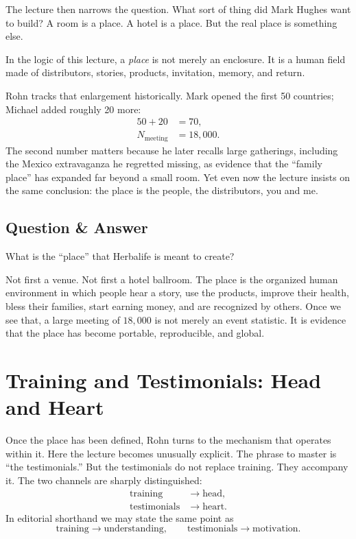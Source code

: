 The lecture then narrows the question. What sort of thing did Mark Hughes want to build? A room is a place. A hotel is a place. But the real place is something else.

\begin{definition}
In the logic of this lecture, a \emph{place} is not merely an enclosure. It is a human field made of distributors, stories, products, invitation, memory, and return.
\end{definition}

Rohn tracks that enlargement historically. Mark opened the first 50 countries; Michael added roughly 20 more:
\begin{align}
50 + 20 &= 70,\\
N_{\text{meeting}} &= 18{,}000.
\end{align}
The second number matters because he later recalls large gatherings, including the Mexico extravaganza he regretted missing, as evidence that the ``family place'' has expanded far beyond a small room. Yet even now the lecture insists on the same conclusion: the place is the people, the distributors, you and me.

\subsection{Question \& Answer}

What is the ``place'' that Herbalife is meant to create?

Not first a venue. Not first a hotel ballroom. The place is the organized human environment in which people hear a story, use the products, improve their health, bless their families, start earning money, and are recognized by others. Once we see that, a large meeting of \(18{,}000\) is not merely an event statistic. It is evidence that the place has become portable, reproducible, and global.

\section{Training and Testimonials: Head and Heart}

Once the place has been defined, Rohn turns to the mechanism that operates within it. Here the lecture becomes unusually explicit. The phrase to master is ``the testimonials.'' But the testimonials do not replace training. They accompany it. The two channels are sharply distinguished:
\begin{align}
\text{training} &\to \text{head},\\
\text{testimonials} &\to \text{heart}.
\end{align}
In editorial shorthand we may state the same point as
\begin{equation}
\text{training} \to \text{understanding}, \qquad
\text{testimonials} \to \text{motivation}.
\end{equation}

